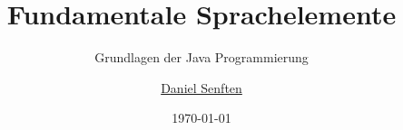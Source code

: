 \documentclass{manual}
\title{Fundamentale Sprachelemente}
\subtitle{Grundlagen der Java Programmierung}
\date{\today}
\author{\href{mailto:daniel.senften@talent-factory.ch}{Daniel Senften}}
\begin{document}


\newpage\appendix
\listofexercises

\renewcommand{\listoflistingscaption}{Programmbeispiele}
\newpage\listoflistings
\end{document}
